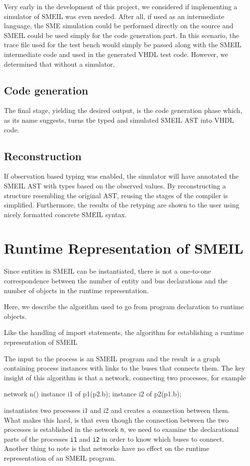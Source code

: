 Very early in the development of this project, we considered if implementing a
simulator of SMEIL was even needed. After all, if used as an intermediate
language, the SME simulation could be performed directly on the source and SMEIL
could be used simply for the code generation part. In this scenario, the trace
file used for the test bench would simply be passed along with the SMEIL
intermediate code and used in the generated VHDL test code. However, we
determined that without a simulator, 

\subsection{Code generation}
The final stage, yielding the desired output, is the code generation phase
which, as its name suggests, turns the typed and simulated SMEIL AST into VHDL
code.
\subsection{Reconstruction} If observation based typing was enabled, the
simulator will have annotated the SMEIL AST with types based on the observed
values. By reconstructing a structure resembling the original AST, reusing the
stages of the compiler is simplified. Furthermore, the results of the retyping
are shown to the user using nicely formatted concrete SMEIL syntax.

\section{Runtime Representation of SMEIL}
Since entities in SMEIL can be instantiated, there is not a one-to-one
correspondence between the number of entity and bus declarations and the number
of objects in the runtime representation.

Here, we describe the algorithm used
to go from program declaration to runtime objects. 

Like the handling of import statements, the algorithm for establishing a runtime
representation of SMEIL 


The input to the process is an SMEIL program and the result is a graph
containing process instances with links to the buses that connects
them.
The key insight of this algorithm is that a network, connecting two processes,
for example
\begin{smeilcode}
  network n() {
    instance i1 of p1(p2.b);
    instance i2 of p2(p1.b);
  }
\end{smeilcode}
instantiates two processes i1 and i2 and creates a connection between them. What
makes this hard, is that even though the connection between the two processes is
established in the network {\tt n}, we need to examine the declarational parts
of the processes {\tt i1} and {\tt i2} in order to know which buses to
connect. Another thing to note is that networks have no effect on the runtime
representation of an SMEIL program.

